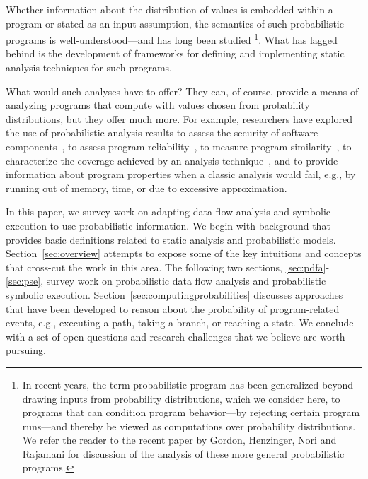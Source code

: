 
Whether information about the distribution of
values is embedded within a program or stated as an input assumption,
the semantics of such probabilistic programs is well-understood---and
has long been studied 
\cite{kozen1981semantics,kozen1983probabilistic,jones1990probabilistic,morgan1996probabilistic}
\setcounter{footnote}{0}
\footnote{In recent
years, the term probabilistic program has been generalized beyond
drawing inputs from probability distributions, which we
consider here, to programs that can condition program behavior---by
rejecting certain program runs---and thereby be viewed as
computations over probability distributions.  We refer the reader to the
recent paper by Gordon, Henzinger, Nori and Rajamani \cite{Gordon2014}
for discussion of the analysis of these more general probabilistic programs.}. 
What has lagged behind is the development of frameworks for 
defining and implementing static analysis techniques for such programs.

What would such analyses have to offer?
They can, of course, provide a means of analyzing programs that compute
with values chosen from probability distributions, but they offer much
more.
For example, researchers have explored the use of probabilistic analysis
results to assess the security of software components~\cite{mardziel2013dynamic},
to assess program reliability~\cite{Filieri2013}, to measure program
similarity~\cite{Geldenhuys2012}, 
to characterize the coverage
achieved by an analysis technique~\cite{DwyerASE11}, and to provide information
about program properties when a classic analysis would fail, e.g.,
by running out of memory, time, or due to excessive approximation.

In this paper, we survey work on adapting data flow analysis 
and symbolic execution to use probabilistic information.
We begin with background that provides basic definitions
related to static analysis and probabilistic models.
Section~\ref{sec:overview} attempts to expose some of the key
intuitions and concepts that cross-cut the work in this area.
The following two sections, \ref{sec:pdfa}-\ref{sec:pse}, 
survey work on probabilistic data flow analysis and probabilistic
symbolic execution.  
Section~\ref{sec:computingprobabilities} discusses approaches that
have been developed to reason about the probability of program-related 
events, e.g., executing a path, taking a branch, or reaching a state.
We conclude with a set of open questions
and research challenges that we believe are worth pursuing.

